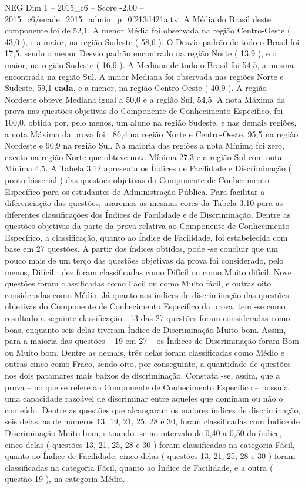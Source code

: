 \begin{textsample}{NEG Dim 1 – 2015\_c6 – Score -2.00 – 2015\_c6/enade\_2015\_admin\_p\_0f213d421a.txt}
A Média do Brasil deste componente foi de 52,1.
A menor Média foi observada na região Centro-Oeste ( 43,0 ), e a maior, na região Sudeste ( 58,6 ).
O Desvio padrão de todo o Brasil foi 17,5, sendo o menor Desvio padrão encontrado na região Norte ( 13,9 ), e o maior, na região Sudeste ( 16,9 ).
A Mediana de todo o Brasil foi 54,5, a mesma encontrada na região Sul.
A maior Mediana foi observada nas regiões Norte e Sudeste, 59,1 \textbf{cada}, e a menor, na região Centro-Oeste ( 40,9 ).
A região Nordeste obteve Mediana igual a 50,0 e a região Sul, 54,5.
A nota Máxima da prova nas questões objetivas do Componente de Conhecimento Específico, foi 100,0, obtida por, pelo menos, um aluno na região Sudeste, e nas demais regiões, a nota Máxima da prova foi : 86,4 na região Norte e Centro-Oeste, 95,5 na região Nordeste e 90,9 na região Sul.
Na maioria das regiões a nota Mínima foi zero, exceto na região Norte que obteve nota Mínima 27,3 e a região Sul com nota Mínima 4,5.
A Tabela 3.12 apresenta os Índices de Facilidade e Discriminação ( ponto bisserial ) das questões objetivas do Componente de Conhecimento Específico para os estudantes de Administração Pública.
Para facilitar a diferenciação das questões, usaremos as mesmas cores da Tabela 3.10 para as diferentes classificações dos Índices de Facilidade e de Discriminação.
Dentre as questões objetivas da parte da prova relativa ao Componente de Conhecimento Específico, a classificação, quanto ao Índice de Facilidade, foi estabelecida com base em 27 questões.
A partir dos índices obtidos, pode -se concluir que um pouco mais de um terço das questões objetivas da prova foi considerado, pelo menos, Difícil : dez foram classificadas como Difícil ou como Muito difícil.
Nove questões foram classificadas como Fácil ou como Muito fácil, e outras oito consideradas como Médio.
Já quanto aos índices de discriminação das questões objetivas do Componente de Conhecimento Específico da prova, tem -se como resultado a seguinte classificação : 13 das 27 questões foram consideradas como boas, enquanto seis delas tiveram Índice de Discriminação Muito bom.
Assim, para a maioria das questões – 19 em 27 – os Índices de Discriminação foram Bom ou Muito bom.
Dentre as demais, três delas foram classificadas como Médio e outras cinco como Fraco, sendo oito, por conseguinte, a quantidade de questões nos dois patamares mais baixos de discriminação.
Constata -se, assim, que a prova – no que se refere ao Componente de Conhecimento Específico – possuía uma capacidade razoável de discriminar entre aqueles que dominam ou não o conteúdo.
Dentre as questões que alcançaram os maiores índices de discriminação, seis delas, as de números 13, 19, 21, 25, 28 e 30, foram classificadas com Índice de Discriminação Muito bom, situando -se no intervalo de 0,40 a 0,50 do índice, cinco delas ( questões 13, 21, 25, 28 e 30 ) foram classificadas na categoria Fácil, quanto ao Índice de Facilidade, cinco delas ( questões 13, 21, 25, 28 e 30 ) foram classificadas na categoria Fácil, quanto ao Índice de Facilidade, e a outra ( questão 19 ), na categoria Médio.

\end{textsample}
